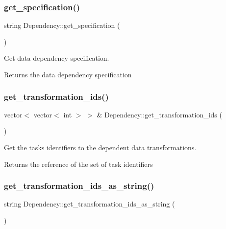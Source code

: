 \subsubsection{\texorpdfstring{get\+\_\+specification()}{get\_specification()}}
{\footnotesize\ttfamily string Dependency\+::get\+\_\+specification (\begin{DoxyParamCaption}{ }\end{DoxyParamCaption})}

Get data dependency specification. \begin{DoxyReturn}{Returns}
the data dependency specification 
\end{DoxyReturn}
\mbox{\label{classDependency_a9854eb2da947e302cefa36d25a880208}} 
\subsubsection{\texorpdfstring{get\+\_\+transformation\+\_\+ids()}{get\_transformation\_ids()}}
{\footnotesize\ttfamily vector$<$ vector$<$ int $>$ $>$ \& Dependency\+::get\+\_\+transformation\+\_\+ids (\begin{DoxyParamCaption}{ }\end{DoxyParamCaption})}

Get the tasks identifiers to the dependent data transformations. \begin{DoxyReturn}{Returns}
the reference of the set of task identifiers 
\end{DoxyReturn}
\mbox{\label{classDependency_ab83b7f76991bb3f0ae6a42631002c8f4}} 
\subsubsection{\texorpdfstring{get\+\_\+transformation\+\_\+ids\+\_\+as\+\_\+string()}{get\_transformation\_ids\_as\_string()}}
{\footnotesize\ttfamily string Dependency\+::get\+\_\+transformation\+\_\+ids\+\_\+as\+\_\+string (\begin{DoxyParamCaption}{ }\end{DoxyParamCaption})}

